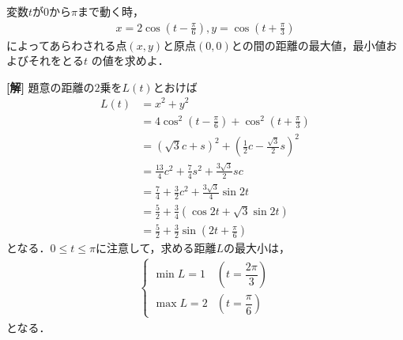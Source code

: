 \documentclass[a4j]{jarticle}
\title{}
\begin{document}

\begin{oframed}
変数$t$が$0$から$\pi$まで動く時，
     \begin{align*}
     x=2\cos\left(t-\frac{\pi}{6}\right) , y=\cos\left(t+\frac{\pi}{3}\right)
     \end{align*}
によってあらわされる点$(x,y)$と原点$(0,0)$との間の距離の最大値，最小値およびそれをとる$t$
の値を求めよ．     
\end{oframed}

\setlength{\columnseprule}{0.4pt}
\begin{multicols}{2}
{\bf[解]}\2 題意の距離の$2$乗を$L(t)$とおけば
     \begin{align*}
     L(t)&=x^2+y^2 \\
     &=4\cos^2\left(t-\frac{\pi}{6}\right)+\cos^2\left(t+\frac{\pi}{3}\right)  \\
     &=\left(\sqrt{3}c+s\right)^2+\left(\frac{1}{2}c-\frac{\sqrt{3}}{2}s\right)^2 \\
     &=\frac{13}{4}c^2+\frac{7}{4}s^2+\frac{3\sqrt{3}}{2}sc  \\
     &=\frac{7}{4}+\frac{3}{2}c^2+\frac{3\sqrt{3}}{4}\sin2t \\
     &=\frac{5}{2}+\frac{3}{4}(\cos2t+\sqrt{3}\sin2t) \\
     &=\frac{5}{2}+\frac{3}{2}\sin\left(2t+\frac{\pi}{6}\right)
     \end{align*}
となる．$0\le t\le \pi$に注意して，求める距離$L$の最大小は，
     \begin{align*}
     \left\{
          \begin{array}{ll}
          \min L=1 &\left(t=\dfrac{2\pi}{3}\right)     \\
          \max L=2 &\left(t=\dfrac{\pi}{6}\right)
          \end{array}
     \right.\tag{答}
     \end{align*}     
となる．
\newpage
\end{multicols}
\end{document}
